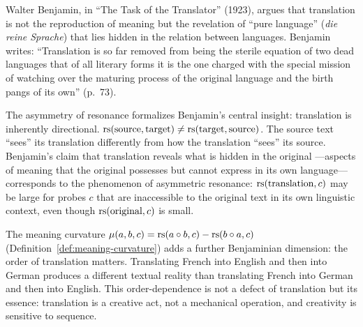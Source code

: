 \begin{interpretation}\label{interp:ch4:benjamin_translator}
Walter Benjamin, in ``The Task of the Translator'' (1923), argues that
translation is not the reproduction of meaning but the revelation of
``pure language'' (\emph{die reine Sprache}) that lies hidden in the
relation between languages. Benjamin writes: ``Translation is so far
removed from being the sterile equation of two dead languages that of
all literary forms it is the one charged with the special mission of
watching over the maturing process of the original language and the
birth pangs of its own'' (p.~73).

The asymmetry of resonance formalizes Benjamin's central insight:
translation is inherently directional. $\mathrm{rs}(\text{source}, \text{target})
\neq \mathrm{rs}(\text{target}, \text{source})$. The source text ``sees'' its
translation differently from how the translation ``sees'' its source.
Benjamin's claim that translation reveals what is hidden in the original
---aspects of meaning that the original possesses but cannot express in
its own language---corresponds to the phenomenon of asymmetric resonance:
$\mathrm{rs}(\text{translation}, c)$ may be large for probes $c$ that are
inaccessible to the original text in its own linguistic context, even
though $\mathrm{rs}(\text{original}, c)$ is small.

The meaning curvature $\mu(a, b, c) = \mathrm{rs}(a \circ b, c) - \mathrm{rs}(b
\circ a, c)$ (Definition~\ref{def:meaning-curvature}) adds a further
Benjaminian dimension: the order of translation matters. Translating
French into English and then into German produces a different textual
reality than translating French into German and then into English. This
order-dependence is not a defect of translation but its essence:
translation is a creative act, not a mechanical operation, and
creativity is sensitive to sequence.
\end{interpretation}

